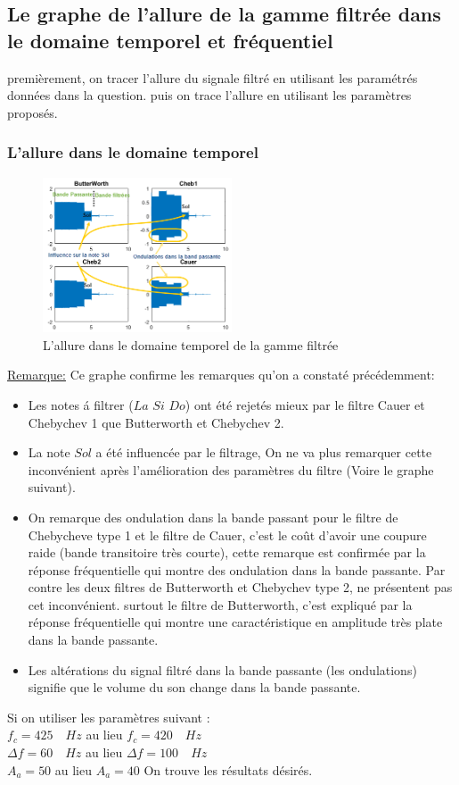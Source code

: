 \documentclass[twoside,twocolumn]{article}
\begin{document}
\subsection{Le graphe de l'allure de la gamme filtrée dans le domaine temporel et fréquentiel}
premièrement, on tracer l'allure du signale filtré en utilisant les paramétrés données dans la question. puis on trace l'allure en utilisant les paramètres proposés. 
\label{matlab}

\subsubsection{L'allure dans le domaine temporel}
\begin{figure}[H]
\centering
\includegraphics[width=0.5\textwidth]{Images/5.png}
\caption{ L'allure dans le domaine temporel de la gamme filtrée}
\end{figure}

\underline{Remarque:}
Ce graphe confirme les remarques qu'on a constaté précédemment:
\begin{itemize}
\item
Les notes á filtrer ($La$ $Si$ $Do$) ont été rejetés mieux par le filtre Cauer et Chebychev 1 que Butterworth et Chebychev 2.
\item
La note $Sol$ a été influencée par le filtrage, On ne va plus remarquer cette inconvénient   après l'amélioration des paramètres du filtre (Voire le graphe suivant).
\item 
On remarque des ondulation dans la bande passant pour le filtre de Chebycheve type 1 et le filtre de Cauer, c'est le coût d'avoir une coupure raide (bande transitoire très courte), cette remarque est confirmée par la réponse fréquentielle qui montre des ondulation dans la bande passante.
Par contre les deux filtres de Butterworth et Chebychev type 2, ne présentent pas cet inconvénient. surtout le filtre de Butterworth, c'est expliqué par la réponse fréquentielle qui montre une caractéristique en amplitude très plate dans la bande passante.
\item Les altérations du signal filtré dans la bande passante (les ondulations) signifie que le volume du son change dans la bande passante.

\end{itemize}
Si on utiliser les paramètres suivant :\\
 $f_c = 425\quad Hz$  \quad au lieu  \quad $f_c = 420\quad Hz$ \\
$\Delta f = 60\quad Hz$ \quad au lieu \quad $\Delta f = 100\quad Hz$ \\
$A_a = 50$ \quad au lieu \quad $A_a = 40$
 On trouve les résultats désirés.
 
\end{document}
